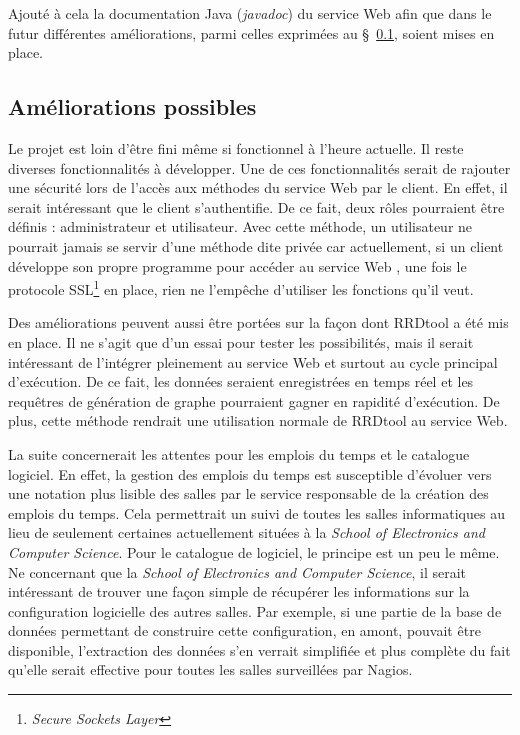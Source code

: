 Ajout\'e \`a cela la documentation Java (\textit{javadoc}) du service Web afin que dans le futur diff\'erentes am\'eliorations, parmi celles exprim\'ees au \S~\ref{section:amelioration}, soient mises en place.

\subsection{Am\'eliorations possibles}
\label{section:amelioration}

Le projet {\YuukouII} est loin d'\^etre fini m\^eme si fonctionnel \`a l'heure actuelle.
Il reste diverses fonctionnalit\'es \`a d\'evelopper.
Une de ces fonctionnalit\'es serait de rajouter une s\'ecurit\'e lors de l'acc\`es aux m\'ethodes du service Web par le client.
En effet, il serait int\'eressant que le client s'authentifie.
De ce fait, deux r\^oles pourraient \^etre d\'efinis : administrateur et utilisateur.
Avec cette m\'ethode, un utilisateur ne pourrait jamais se servir d'une m\'ethode dite priv\'ee car actuellement, si un client d\'eveloppe son propre programme pour acc\'eder au service Web {\YuukouII}, une fois le protocole SSL\protect\footnote{\textit{Secure Sockets Layer}} en place, rien ne l'emp\^eche d'utiliser les fonctions qu'il veut.

Des am\'eliorations peuvent aussi \^etre port\'ees sur la fa\c{c}on dont RRDtool a \'et\'e mis en place.
Il ne s'agit que d'un essai pour tester les possibilit\'es, mais il serait int\'eressant de l'int\'egrer pleinement au service Web et surtout au cycle principal d'ex\'ecution.
De ce fait, les donn\'ees seraient enregistr\'ees en temps r\'eel et les requ\^etres de g\'en\'eration de graphe pourraient gagner en rapidit\'e d'ex\'ecution.
De plus, cette m\'ethode rendrait une utilisation normale de RRDtool au service Web.

La suite concernerait les attentes pour les emplois du temps et le catalogue logiciel.
En effet, la gestion des emplois du temps est susceptible d'\'evoluer vers une notation plus lisible des salles par le service responsable de la cr\'eation des emplois du temps.
Cela permettrait un suivi de toutes les salles informatiques au lieu de seulement certaines actuellement situ\'ees \`a la \textit{School of Electronics and Computer Science}.
Pour le catalogue de logiciel, le principe est un peu le m\^eme.
Ne concernant que la \textit{School of Electronics and Computer Science}, il serait int\'eressant de trouver une fa\c{c}on simple de r\'ecup\'erer les informations sur la configuration logicielle des autres salles.
Par exemple, si une partie de la base de donn\'ees permettant de construire cette configuration, en amont, pouvait \^etre disponible, l'extraction des donn\'ees s'en verrait simplifi\'ee et plus compl\`ete du fait qu'elle serait effective pour toutes les salles surveill\'ees par Nagios.

